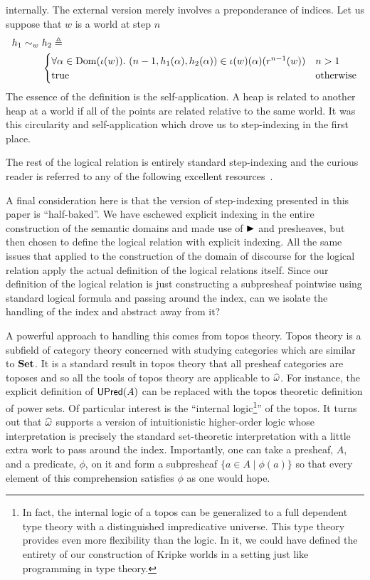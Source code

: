 internally. The external version merely involves a preponderance of
indices. Let us suppose that $w$ is a world at step $n$
\begin{align*}
  h_1 \sim_w {} &h_2 \mathrel{\triangleq}\\
  &\begin{cases}
    \forall \alpha \in \operatorname{Dom}(\iota(w)).\ (n - 1, h_1(\alpha), h_2(\alpha)) \in \iota(w)(\alpha)(r^{n - 1}(w))
    & n > 1\\
    \text{true} & \text{otherwise}
  \end{cases}
\end{align*}
The essence of the definition is the self-application. A heap is
related to another heap at a world if all of the points are related
relative to the same world. It was this circularity and
self-application which drove us to step-indexing in the first place.

The rest of the logical relation is entirely standard step-indexing
and the curious reader is referred to any of the following excellent
resources~\citet{TODO-STEP-INDEXING}.

A final consideration here is that the version of step-indexing
presented in this paper is ``half-baked''. We have eschewed explicit
indexing in the entire construction of the semantic domains and made
use of ${\blacktriangleright}$ and presheaves, but then chosen to define the logical
relation with explicit indexing. All the same issues that applied to
the construction of the domain of discourse for the logical relation
apply the actual definition of the logical relations itself. Since our
definition of the logical relation is just constructing a subpresheaf
pointwise using standard logical formula and passing around the index,
can we isolate the handling of the index and abstract away from it?

A powerful approach to handling this comes from topos theory. Topos
theory is a subfield of category theory concerned with studying
categories which are similar to $\mathbf{Set}$. It is a standard result in
topos theory that all presheaf categories are toposes and so all the
tools of topos theory are applicable to $\widehat{\omega}$. For
instance, the explicit definition of $\mathsf{UPred}(A)$ can be replaced with
the topos theoretic definition of power sets. Of particular interest
is the ``internal logic\footnote{In fact, the internal logic of a
  topos can be generalized to a full dependent type theory with a
  distinguished impredicative universe. This type theory provides even
  more flexibility than the logic. In it, we could have defined the
  entirety of our construction of Kripke worlds in a setting just like
  programming in type theory.}'' of the topos. It turns out that
$\widehat{\omega}$ supports a version of intuitionistic
higher-order logic whose interpretation is precisely the standard
set-theoretic interpretation with a little extra work to pass around
the index. Importantly, one can take a presheaf, $A$, and a predicate,
$\phi$, on it and form a subpresheaf $\{ a \in A \mid \phi(a) \}$ so
that every element of this comprehension satisfies $\phi$ as one would
hope.

